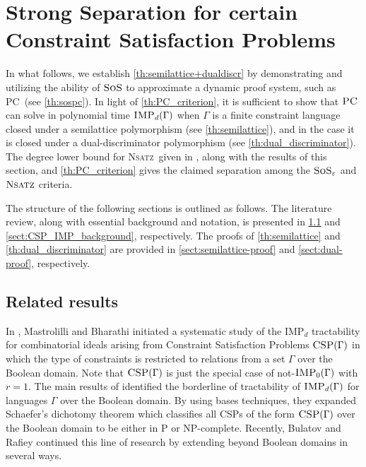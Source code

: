 \documentclass[11pt]{article}
\newcommand{\sos}{\text{\sc{SoS}}}
\newcommand{\CSP}{\textsc{CSP}}
\newcommand{\IMP}{\textsc{IMP}}
\newcommand{\PC}{\textsc{PC}}
\newcommand{\Nsatz}{\textsc{Nsatz}}
\newcommand{\1}{\textbf{1}}
\newcommand{\GB}{\text{Gr\"{o}bner} }
\begin{document}
\section{Strong Separation for certain Constraint Satisfaction Problems}\label{sect:applications}
In what follows, we establish \cref{th:semilattice+dualdiscr} by demonstrating and utilizing the ability of \(\sos\) to approximate a dynamic proof system, such as \PC\ (see \cref{th:sospc}).
 In light of \cref{th:PC_criterion}, it is sufficient to show that $\PC$ can solve in polynomial time $\IMP_d(\Gamma)$ when $\Gamma$ is a finite constraint language closed under a semilattice polymorphism (see \cref{th:semilattice}), and in the case it is closed under a dual-discriminator polymorphism (see \cref{th:dual_discriminator}). 
The degree lower bound for \Nsatz\ given in \cite{BussP98}, along with the results of this section, and \cref{th:PC_criterion} gives the claimed separation among the $\sos_{\varepsilon}$ and $\Nsatz$ criteria. 

The structure of the following sections is outlined as follows. The literature review, along with essential background and notation, is presented in \cref{sect:csp_literature} and \cref{sect:CSP_IMP_background}, respectively. The proofs of \cref{th:semilattice} and \cref{th:dual_discriminator} are provided in \cref{sect:semilattice-proof} and \cref{sect:dual-proof}, respectively.
\subsection{Related results} \label{sect:csp_literature}
In \cite{Mastrolilli21TALG, BharathiM21}, Mastrolilli and Bharathi initiated a systematic study of the IMP$_d$ tractability for combinatorial ideals arising from Constraint Satisfaction Problems $\CSP(\Gamma)$ in which the type of constraints is restricted to relations from a set $\Gamma$ over the Boolean domain.
Note that $\CSP(\Gamma)$ is just the special case of not-$\IMP_0(\Gamma)$ with $r=1$.
The main results of \cite{Mastrolilli21TALG, BharathiM21} identified the borderline of tractability of $\IMP_d(\Gamma)$ for languages $\Gamma$ over the Boolean domain. By using \GB bases techniques, they expanded Schaefer's dichotomy theorem \cite{Schaefer78} which classifies all CSPs of the form $\CSP(\Gamma)$ over the Boolean domain to be either in P or NP-complete. Recently, Bulatov and Rafiey \cite{BulatovRSTOC22, BulatovRSTACS22} continued this line of research by extending \cite{Mastrolilli21TALG, BharathiM21} beyond Boolean domains in several ways. 
\end{document}
